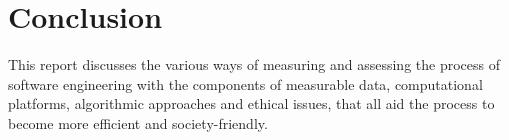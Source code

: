 \documentclass[a4paper]{article}
\begin{document}
{\section{Conclusion}
This report discusses the various ways of measuring and assessing the process of software engineering with the components of measurable data, computational platforms, algorithmic approaches and ethical issues, that all aid the process to become more efficient and society-friendly.
}


\printbibliography
\end{document}
